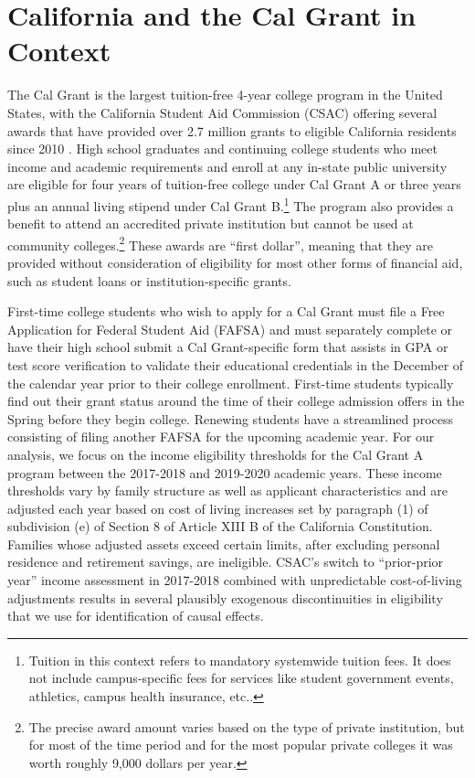\documentclass[12pt,letterpaper,oneside]{book}
\begin{document}
\section{California and the Cal Grant in Context} \label{sec:context}
The Cal Grant is the largest tuition-free 4-year college program in the United States, with the California Student Aid Commission (CSAC) offering several awards that have provided over 2.7 million grants to eligible California residents since 2010 \citep{kane_quasi-experimental_2003,bettinger_long-run_2019,dickler_5_2022,scott-clayton_fine_2022}. High school graduates and continuing college students who meet income and academic requirements and enroll at any in-state public university are eligible for four years of tuition-free college under Cal Grant A or three years plus an annual living stipend under Cal Grant B.\footnote{Tuition in this context refers to mandatory systemwide tuition fees. It does not include campus-specific fees for services like student government events, athletics, campus health insurance, etc..} The program also provides a benefit to attend an accredited private institution but cannot be used at community colleges.\footnote{The precise award amount varies based on the type of private institution, but for most of the time period and for the most popular private colleges it was worth roughly 9,000 dollars per year.} These awards are ``first dollar'', meaning that they are provided without consideration of eligibility for most other forms of financial aid, such as student loans or institution-specific grants.

First-time college students who wish to apply for a Cal Grant must file a Free Application for Federal Student Aid (FAFSA) and must separately complete or have their high school submit a Cal Grant-specific form that assists in GPA or test score verification to validate their educational credentials in the December of the calendar year prior to their college enrollment. First-time students typically find out their grant status around the time of their college admission offers in the Spring before they begin college. Renewing students have a streamlined process consisting of filing another FAFSA for the upcoming academic year. For our analysis, we focus on the income eligibility thresholds for the Cal Grant A program between the 2017-2018 and 2019-2020 academic years. These income thresholds vary by family structure as well as applicant characteristics and are adjusted each year based on cost of living increases set by paragraph (1) of subdivision (e) of Section 8 of Article XIII B of the California Constitution. Families whose adjusted assets exceed certain limits, after excluding personal residence and retirement savings, are ineligible. CSAC's switch to ``prior-prior year'' income assessment in 2017-2018 combined with unpredictable cost-of-living adjustments results in several plausibly exogenous discontinuities in eligibility that we use for identification of causal effects.
\end{document}
